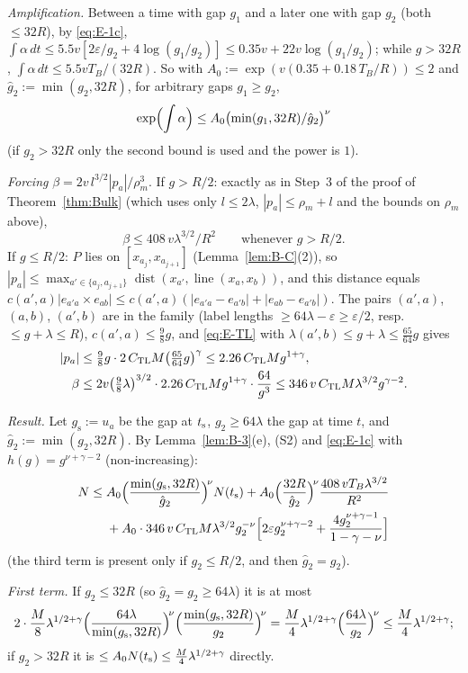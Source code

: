 \emph{Amplification.} Between a time with gap $g_1$ and a later one with gap $g_2$ (both $\le32R$), by \eqref{eq:E-1c},
$\int\alpha\,dt\le5.5v[2\varepsilon/g_2+4\log(g_1/g_2)]\le0.35v+22v\log(g_1/g_2)$; while $g>32R$,
$\int\alpha\,dt\le5.5vT_B/(32R)$. So with $A_0:=\exp(v(0.35+0.18\,T_B/R))\le2$ and $\hat g_2:=\min(g_2,32R)$, for arbitrary gaps
$g_1\ge g_2$,
\[
\exp\Bigl(\int\alpha\Bigr)\le A_0\bigl(\min(g_1,32R)/\hat g_2\bigr)^\nu
\]
(if $g_2>32R$ only the second bound is used and the power is $1$).

\emph{Forcing} $\beta=2v\,l^{3/2}|p_a|/\rho_m^3$. If $g>R/2$: exactly as in Step~3 of the proof of Theorem~\ref{thm:Bulk} (which
uses only $l\le2\lambda$, $|p_a|\le\rho_m+l$ and the bounds on $\rho_m$ above),
\[
\beta\le408\,v\lambda^{3/2}/R^2\qquad\text{whenever }g>R/2 .
\]
If $g\le R/2$: $P$ lies on $[x_{a_j},x_{a_{j+1}}]$ (Lemma~\ref{lem:B-C}(2)), so
$|p_a|\le\max_{a'\in\{a_j,a_{j+1}\}}\operatorname{dist}(x_{a'},\operatorname{line}(x_a,x_b))$, and this distance equals
$c(a',a)|e_{a'a}\times e_{ab}|\le c(a',a)(|e_{a'a}-e_{a'b}|+|e_{ab}-e_{a'b}|)$. The pairs $(a',a)$, $(a,b)$, $(a',b)$ are in the
family (label lengths $\ge64\lambda-\varepsilon\ge\varepsilon/2$, resp.\ $\le g+\lambda\le R$), $c(a',a)\le\frac98g$, and
\eqref{eq:E-TL} with $\lambda(a',b)\le g+\lambda\le\frac{65}{64}g$ gives
\begin{align*}
|p_a|&\le\tfrac98g\cdot2\,C_{\mathrm{TL}} M\bigl(\tfrac{65}{64}g\bigr)^\gamma\le2.26\,C_{\mathrm{TL}} Mg^{1+\gamma},\\
\beta&\le2v\bigl(\tfrac98\lambda\bigr)^{3/2}\cdot2.26\,C_{\mathrm{TL}} Mg^{1+\gamma}\cdot\frac{64}{g^3}\le346\,v\,C_{\mathrm{TL}} M\lambda^{3/2}g^{\gamma-2}.
\end{align*}

\emph{Result.} Let $g_{\mathrm s}:=u_a$ be the gap at $t_{\mathrm s}$, $g_2\ge64\lambda$ the gap at time $t$, and
$\hat g_2:=\min(g_2,32R)$. By Lemma~\ref{lem:B-3}(e), (S2) and \eqref{eq:E-1c} with $h(g)=g^{\nu+\gamma-2}$ (non-increasing):
\begin{align*}
N\le{}&A_0\Bigl(\frac{\min(g_{\mathrm s},32R)}{\hat g_2}\Bigr)^{\!\nu}N(t_{\mathrm s})
+A_0\Bigl(\frac{32R}{\hat g_2}\Bigr)^{\!\nu}\frac{408\,vT_B\lambda^{3/2}}{R^2}\\
&+A_0\cdot346\,v\,C_{\mathrm{TL}} M\lambda^{3/2}g_2^{-\nu}\Bigl[2\varepsilon g_2^{\nu+\gamma-2}+\frac{4g_2^{\nu+\gamma-1}}{1-\gamma-\nu}\Bigr]
\end{align*}
(the third term is present only if $g_2\le R/2$, and then $\hat g_2=g_2$).

\emph{First term.} If $g_2\le32R$ (so $\hat g_2=g_2\ge64\lambda$) it is at most
\[
2\cdot\frac M8\lambda^{1/2+\gamma}\Bigl(\frac{64\lambda}{\min(g_{\mathrm s},32R)}\Bigr)^{\!\nu}
\Bigl(\frac{\min(g_{\mathrm s},32R)}{g_2}\Bigr)^{\!\nu}
=\frac M4\lambda^{1/2+\gamma}\Bigl(\frac{64\lambda}{g_2}\Bigr)^{\!\nu}\le\frac M4\lambda^{1/2+\gamma};
\]
if $g_2>32R$ it is $\le A_0N(t_{\mathrm s})\le\frac M4\lambda^{1/2+\gamma}$ directly.


